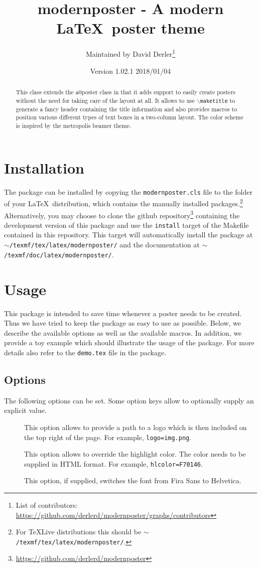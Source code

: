 \documentclass{article}
\title{modernposter - A modern \LaTeX~poster theme}
\author{Maintained by David Derler\thanks{List of contributors: \url{https://github.com/derlerd/modernposter/graphs/contributors}}}
\date{Version 1.02.1 2018/01/04}
\begin{document}
  \maketitle

  \begin{abstract}
\noindent This class extends the a0poster class in that it adds support to easily create posters without the need for taking care of the layout at all. It allows to use {\tt $\backslash$maketitle} to generate a fancy header containing the title information and also provides macros to position various different types of text boxes in a two-column layout. The color scheme  is inspired by the metropolis beamer theme.
  \end{abstract}
  \section{Installation}
  The package can be installed by copying the {\tt modernposter.cls} file to the folder of your \LaTeX~distribution, which contains the manually installed packages.\footnote{For TeXLive distributions this should be {\tt $\sim$/texmf/tex/latex/modernposter/}.} Alternatively, you may choose to clone the github repository\footnote{\url{https://github.com/derlerd/modernposter}} containing the development version of this package and use the {\tt install} target of the Makefile contained in this repository. This target will automatically install the package at {\tt $\sim$/texmf/tex/latex/modern\-poster/} and the documentation at {\tt $\sim$/texmf/doc/latex/modernposter/}.
  \section{Usage}
  This package is intended to save time whenever a poster needs to be created. Thus we have tried to keep the package as easy to use as possible. Below, we describe the available options as well as the available macros. In addition, we provide a toy example which should illustrate the usage of the package. For more details also refer to the {\tt demo.tex} file in the package.
  \subsection{Options}
  The following options can be set. Some option keys allow to optionally supply an explicit value.  
  \begin{description}
  	\item[] This option allows to provide a path to a logo which is then included on the top right of the page. For example, {\tt logo=img.png}.
  	\item[] This option allows to override the highlight color. The color needs to be supplied in HTML format. For example, {\tt hlcolor=F70146}. 
    \item[] This option, if supplied, switches the font from Fira Sans to Helvetica.
  \end{description}
\end{document}
